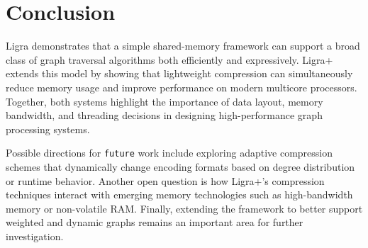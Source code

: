 \documentclass[a4paper,USenglish]{lipics-v2021}
\begin{document}
\section{Conclusion}
Ligra demonstrates that a simple shared-memory framework can support a broad class of graph traversal algorithms both efficiently and expressively. Ligra+ extends this model by showing that lightweight compression can simultaneously reduce memory usage and improve performance on modern multicore processors. Together, both systems highlight the importance of data layout, memory bandwidth, and threading decisions in designing high-performance graph processing systems.

Possible directions for \texttt{future} work include exploring adaptive compression schemes that dynamically change encoding formats based on degree distribution or runtime behavior. Another open question is how Ligra+’s compression techniques interact with emerging memory technologies such as high-bandwidth memory or non-volatile RAM. Finally, extending the framework to better support weighted and dynamic graphs remains an important area for further investigation.


\end{document}
